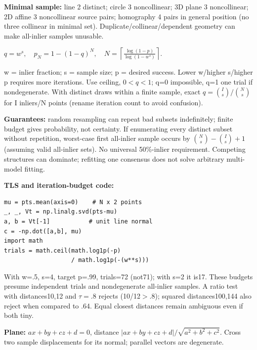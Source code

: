 \documentclass[a4paper]{article}
\newcommand{\key}[1]{\textbf{#1}}
\newcommand{\eq}[1]{\par\noindent\mbox{\(\displaystyle #1\)}\par}
\newcounter{sheet}
\newcounter{sheetcolumn}
\newlength{\colwidth}
\newenvironment{sheetcol}[1][7.0]{\stepcounter{sheetcolumn}
  \begin{lrbox}{\columnbox}\begin{minipage}[t]{\colwidth}\vspace{0pt}
  \fontsize{#1}{\dimexpr#1pt+0.6pt\relax}\selectfont}
  {\end{minipage}\end{lrbox}
  \typeout{CV1COL|\thesheet|\thesheetcolumn|\the\dimexpr\ht\columnbox+\dp\columnbox\relax}
  \usebox{\columnbox}\ignorespacesafterend}
\newcommand{\Sep}{\hfill}
\begin{document}
\begin{sheetcol}[6.5]
\key{Minimal sample:} line 2 distinct; circle 3 noncollinear; 3D plane 3 noncollinear; 2D affine 3 noncollinear source pairs; homography 4 pairs in general position (no three collinear in minimal set). Duplicate/collinear/dependent geometry can make all-inlier samples unusable.
\eq{q=w^s,\quad p_N=1-(1-q)^N,\quad
 N=\left\lceil\frac{\log(1-p)}{\log(1-w^s)}\right\rceil.}
w = inlier fraction; s = sample size; p = desired success. Lower w/higher s/higher p requires more iterations. Use ceiling, \(0<q<1\); q=0 impossible, q=1 one trial if nondegenerate. With distinct draws within a finite sample, exact \(q=\binom Is/\binom Ns\) for I inliers/N points (rename iteration count to avoid confusion).

\key{Guarantees:} random resampling can repeat bad subsets indefinitely; finite budget gives probability, not certainty. If enumerating every distinct subset without repetition, worst-case first all-inlier sample occurs by \(\binom Ns-\binom Is+1\) (assuming valid all-inlier sets). No universal 50\%-inlier requirement. Competing structures can dominate; refitting one consensus does not solve arbitrary multi-model fitting.

\key{TLS and iteration-budget code:}
\begin{lstlisting}
mu = pts.mean(axis=0)    # N x 2 points
_, _, Vt = np.linalg.svd(pts-mu)
a, b = Vt[-1]           # unit line normal
c = -np.dot([a,b], mu)
import math
trials = math.ceil(math.log1p(-p)
                   / math.log1p(-(w**s)))
\end{lstlisting}
With w=.5, s=4, target p=.99, trials=72 (not71); with s=2 it is17. These budgets presume independent trials and nondegenerate all-inlier samples. A ratio test with distances10,12 and \(\tau=.8\) rejects (10/12\(>.8\)); squared distances100,144 also reject when compared to .64. Equal closest distances remain ambiguous even if both tiny.

\key{Plane:} \(ax+by+cz+d=0\), distance \(|ax+by+cz+d|/\sqrt{a^2+b^2+c^2}\). Cross two sample displacements for its normal; parallel vectors are degenerate.
\end{sheetcol}\Sep
\end{document}
